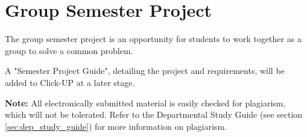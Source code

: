 \section{Group Semester Project}
    The group semester project is an opportunity for students to work together
    as a group to solve a common problem.

    A "Semester Project Guide", detailing the project and requirements, will be
    added to Click-UP at a later stage.

    \textbf{Note:} All electronically submitted material is easily checked for
    plagiarism, which will not be tolerated. Refer to the Departmental Study
    Guide (see section \ref{sec:dep_study_guide}) for more information on
    plagiarism.
